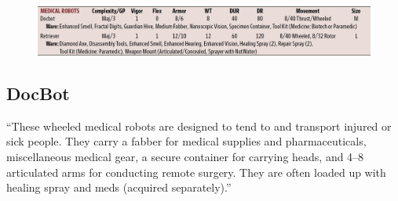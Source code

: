 \begin{figure}[h]
    \includegraphics[width=\textwidth]{img/docBot.png}
\end{figure}

\subsection{DocBot}

“These wheeled medical robots are designed to tend to and transport injured or sick people. They carry a fabber for medical supplies and pharmaceuticals, miscellaneous medical gear, a secure container for carrying heads, and 4–8 articulated arms for conducting remote surgery. They are often loaded up with healing spray and meds (acquired separately).” \citep[pg. 347]{ep2e_1.1_2019}

